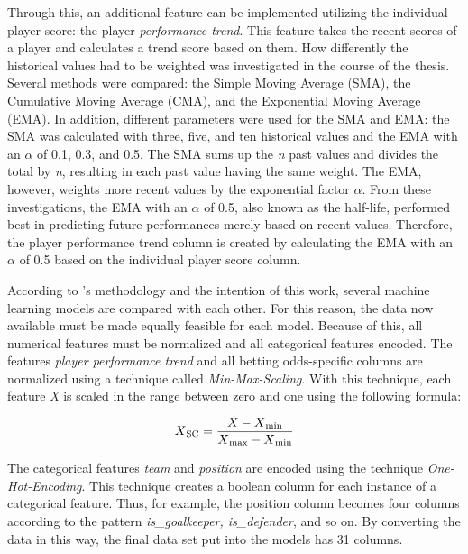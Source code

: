Through this, an additional feature can be implemented utilizing the individual player score: the player \emph{performance trend}. This feature takes the recent scores of a player and calculates a trend score based on them. How differently the historical values had to be weighted was investigated in the course of the thesis. Several methods were compared: the Simple Moving Average (SMA), the Cumulative Moving Average (CMA), and the Exponential Moving Average (EMA). In addition, different parameters were used for the SMA and EMA: the SMA was calculated with three, five, and ten historical values and the EMA with an $\alpha$ of 0.1, 0.3, and 0.5. The SMA sums up the \emph{n} past values and divides the total by \emph{n}, resulting in each past value having the same weight. The EMA, however, weights more recent values by the exponential factor $\alpha$. From these investigations, the EMA with an $\alpha$ of 0.5, also known as the half-life, performed best in predicting future performances merely based on recent values. Therefore, the player performance trend column is created by calculating the EMA with an $\alpha$ of 0.5 based on the individual player score column.

According to \citeauthor{geron_hands-machine_2019}'s methodology and the intention of this work, several machine learning models are compared with each other. For this reason, the data now available must be made equally feasible for each model. Because of this, all numerical features must be normalized and all categorical features encoded. The features \emph{player performance trend} and all betting odds-specific columns are normalized using a technique called \emph{Min-Max-Scaling}. With this technique, each feature \emph{X} is scaled in the range between zero and one using the following formula:

\begin{equation}
    X\textsubscript{SC} = \frac{X - X\textsubscript{min}}{X\textsubscript{max}- X\textsubscript{min}}
    \label{eq:min_max_scaling}
\end{equation}

The categorical features \emph{team} and \emph{position} are encoded using the technique \emph{One-Hot-Encoding}. This technique creates a boolean column for each instance of a categorical feature. Thus, for example, the position column becomes four columns according to the pattern \emph{is\_goalkeeper, is\_defender}, and so on. By converting the data in this way, the final data set put into the models has 31 columns.

